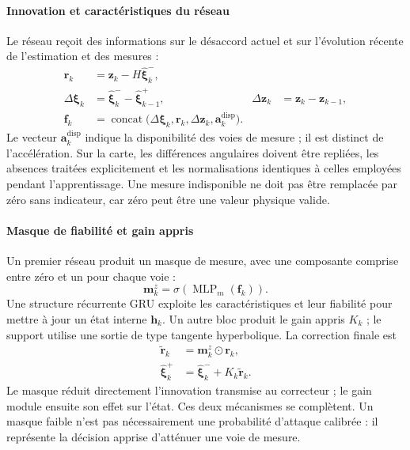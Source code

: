 \documentclass[11pt,a4paper]{article}
\begin{document}
\paragraph{Innovation et caractéristiques du réseau}
Le réseau reçoit des informations sur le désaccord actuel et sur l'évolution récente de l'estimation et des mesures :
\begin{align}
\boldsymbol{r}_k &=\boldsymbol{z}_k-H\widehat{\boldsymbol{\xi}}^-_k,\\
\Delta\boldsymbol{\xi}_k&=\widehat{\boldsymbol{\xi}}^-_k-\widehat{\boldsymbol{\xi}}^+_{k-1},
&\Delta\boldsymbol{z}_k&=\boldsymbol{z}_k-\boldsymbol{z}_{k-1},\\
\boldsymbol{f}_k&=\operatorname{concat}
\bigl(\Delta\boldsymbol{\xi}_k,\boldsymbol{r}_k,
\Delta\boldsymbol{z}_k,\boldsymbol{a}^{\mathrm{disp}}_k\bigr).
\end{align}
Le vecteur $\boldsymbol{a}^{\mathrm{disp}}_k$ indique la disponibilité des voies de mesure ; il est distinct de l'accélération. Sur la carte, les différences angulaires doivent être repliées, les absences traitées explicitement et les normalisations identiques à celles employées pendant l'apprentissage. Une mesure indisponible ne doit pas être remplacée par zéro sans indicateur, car zéro peut être une valeur physique valide.

\paragraph{Masque de fiabilité et gain appris}
Un premier réseau produit un masque de mesure, avec une composante comprise entre zéro et un pour chaque voie :
\begin{equation}
\boldsymbol{m}^z_k=\sigma\!\left(\operatorname{MLP}_m(\boldsymbol{f}_k)\right).
\end{equation}
Une structure récurrente GRU exploite les caractéristiques et leur fiabilité pour mettre à jour un état interne $\boldsymbol{h}_k$. Un autre bloc produit le gain appris $K_k$ ; le support utilise une sortie de type tangente hyperbolique. La correction finale est
\begin{align}
\widetilde{\boldsymbol{r}}_k&=\boldsymbol{m}^z_k\odot\boldsymbol{r}_k,\\
\widehat{\boldsymbol{\xi}}^+_k&=
\widehat{\boldsymbol{\xi}}^-_k+K_k\widetilde{\boldsymbol{r}}_k.
\end{align}
Le masque réduit directement l'innovation transmise au correcteur ; le gain module ensuite son effet sur l'état. Ces deux mécanismes se complètent. Un masque faible n'est pas nécessairement une probabilité d'attaque calibrée : il représente la décision apprise d'atténuer une voie de mesure.
\end{document}
